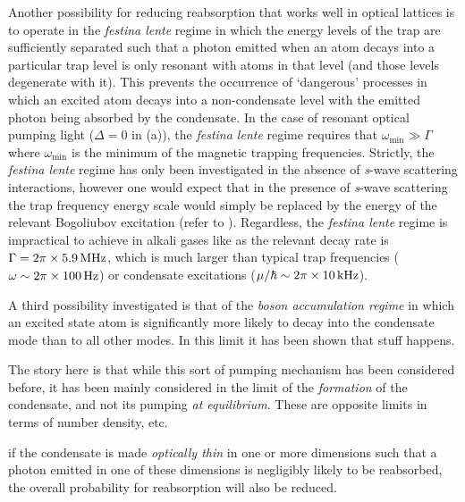 Another possibility for reducing reabsorption that works well in optical lattices is to operate in the \emph{festina lente} regime \citep{Wolf:2000,Santos:1999qf,Cirac:1996,Castin:1998} in which the energy levels of the trap are sufficiently separated such that a photon emitted when an atom decays into a particular trap level is only resonant with atoms in that level (and those levels degenerate with it).  This prevents the occurrence of `dangerous' processes in which an excited atom decays into a non-condensate level with the emitted photon being absorbed by the condensate.  In the case of resonant optical pumping light ($\Delta = 0$ in (a)), the \emph{festina lente} regime requires that $\omega_\text{min} \gg \Gamma$  where $\omega_\text{min}$ is the minimum of the magnetic trapping frequencies.  Strictly, the \emph{festina lente} regime has only been investigated in the absence of \emph{s}-wave scattering interactions, however one would expect that in the presence of \emph{s}-wave scattering the trap frequency energy scale would simply be replaced by the energy of the relevant Bogoliubov excitation (refer to ).  Regardless, the \emph{festina lente} regime is impractical to achieve in alkali gases like  as the relevant decay rate is $\Gamma = \unit[2\pi\times 5.9]{MHz}$, which is much larger than typical trap frequencies ($\omega \sim \unit[2\pi \times 100]{Hz}$) or condensate excitations ($\mu/\hbar \sim \unit[2\pi \times 10]{kHz}$).

A third possibility investigated is that of the \emph{boson accumulation regime} \citep{Cirac:1996rr,Floegel:2001} in which an excited state atom is significantly more likely to decay into the condensate mode than to all other modes.  In this limit it has been shown that stuff happens.




The story here is that while this sort of pumping mechanism has been considered before, it has been mainly considered in the limit of the \emph{formation} of the condensate, and not its pumping \emph{at equilibrium}.  These are opposite limits in terms of number density, etc.  



if the condensate is made \emph{optically thin} in one or more dimensions such that a photon emitted in one of these dimensions is negligibly likely to be reabsorbed, the overall probability for reabsorption will also be reduced.  



